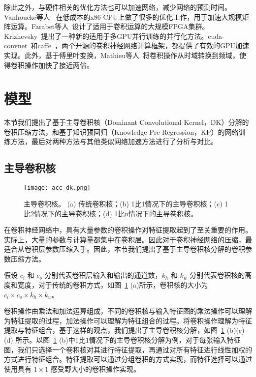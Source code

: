 除此之外，与硬件相关的优化方法也可以加速网络，减少网络的预测时间。Vanhoucke等人~\cite{vanhoucke2011improving} 在低成本的x86 CPU上做了很多的优化工作，用于加速大规模矩阵运算。Farabet等人~\cite{farabet2011large}设计了适用于卷积运算的大规模FPGA集群。Krizhevsky~\cite{krizhevsky2014one}提出了一种新的适用于多GPU并行训练的并行化方法。cuda-convnet~\cite{krizhevsky2012imagenet}和caffe~\cite{jia2014caffe}，两个开源的卷积神经网络计算框架，都提供了有效的GPU加速实现。此外，基于傅里叶变换，Mathieu等人~\cite{mathieu2013fast}将卷积操作从时域转换到频域，使得卷积操作加快了接近两倍。

\section{模型}
\label{sec:acc:model}

本节我们提出了基于主导卷积核（Dominant Convolutional Kernel，DK）分解的卷积压缩方法，和基于知识预回归（Knowledge Pre-Regression，KP）的网络训练方法，最后对两种方法与其他类似网络加速方法进行了分析与对比。

\subsection{主导卷积核}
\label{sec:acc:model:dk}

\begin{figure}
\centering
\texttt{[image: acc\_dk.png]}
\caption{主导卷积核。 (a) 传统卷积核；(b) 1比1情况下的主导卷积核；(c) 1比2情况下的主导卷积核；(d) 1比n情况下的主导卷积核。}
\label{fig:acc_dk}
\end{figure} 

在卷积神经网络中，具有大量参数的卷积操作对特征提取起到了至关重要的作用。实际上，大量的参数与计算量都集中在卷积层。因此对于卷积神经网络的压缩，最适合从卷积层参数压缩入手。因此，本节我们提出了基于主导卷积核分解的卷积参数压缩方法。

假设 $c_i$ 和 $c_o$ 分别代表卷积层输入和输出的通道数，$k_h$ 和 $k_w$ 分别代表卷积核的高度和宽度，对于传统的卷积方式，如图~\ref{fig:acc_dk} (a)所示，卷积核的大小为 $c_i{\times}c_o{\times}k_h{\times}k_w$。

卷积操作由乘法和加法运算组成，不同的卷积核与输入特征图的乘法操作可以理解为特征提取的过程，加法操作可以理解为特征组合的过程。将卷积操作理解为特征提取与特征组合，基于这样的观点，我们提出了主导卷积核分解，如图~\ref{fig:acc_dk} (b)(c)(d) 所示。以图~\ref{fig:acc_dk} (b)中1比1情况下的主导卷积核分解为例，对于每张输入特征图，我们只选择一个卷积核对其进行特征提取，再通过对所有特征进行线性加权的方式进行特征组合。特征提取可以通过分组卷积的方式实现，而特征选择可以通过使用具有 $1\times1$ 感受野大小的卷积操作实现。

